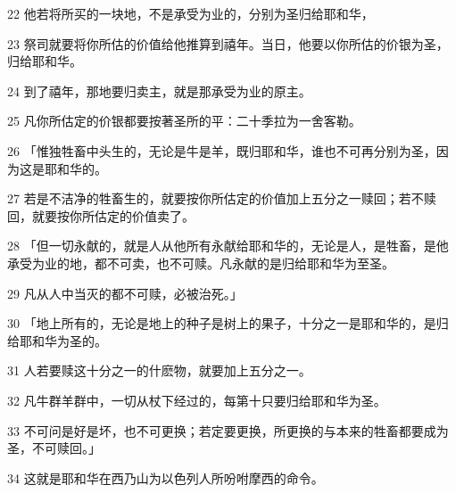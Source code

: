 \par 22 他若将所买的一块地，不是承受为业的，分别为圣归给耶和华，
\par 23 祭司就要将你所估的价值给他推算到禧年。当日，他要以你所估的价银为圣，归给耶和华。
\par 24 到了禧年，那地要归卖主，就是那承受为业的原主。
\par 25 凡你所估定的价银都要按著圣所的平：二十季拉为一舍客勒。
\par 26 「惟独牲畜中头生的，无论是牛是羊，既归耶和华，谁也不可再分别为圣，因为这是耶和华的。
\par 27 若是不洁净的牲畜生的，就要按你所估定的价值加上五分之一赎回；若不赎回，就要按你所估定的价值卖了。
\par 28 「但一切永献的，就是人从他所有永献给耶和华的，无论是人，是牲畜，是他承受为业的地，都不可卖，也不可赎。凡永献的是归给耶和华为至圣。
\par 29 凡从人中当灭的都不可赎，必被治死。」
\par 30 「地上所有的，无论是地上的种子是树上的果子，十分之一是耶和华的，是归给耶和华为圣的。
\par 31 人若要赎这十分之一的什麽物，就要加上五分之一。
\par 32 凡牛群羊群中，一切从杖下经过的，每第十只要归给耶和华为圣。
\par 33 不可问是好是坏，也不可更换；若定要更换，所更换的与本来的牲畜都要成为圣，不可赎回。」
\par 34 这就是耶和华在西乃山为以色列人所吩咐摩西的命令。


